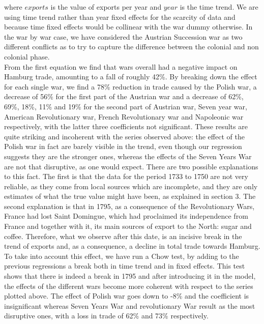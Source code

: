 \documentclass[12pt,a4paper,titlepage,english]{article}
\begin{document}
where $exports$  is the value of exports per year and  $year$ is the time trend. We are using time trend rather than year fixed effects for the scarcity of data and because time fixed effects would be collinear with the war dummy otherwise.
In the war by war case, we have considered the Austrian Succession war as two different conflicts as to try to capture the difference between the colonial and non colonial phase.\\
From the first equation we find that wars overall had a negative impact on Hamburg trade, amounting to a fall of roughly 42\%. By breaking down the effect for each single war, we find a 78\% reduction in trade caused by the Polish war, a decrease of 56\% for the first part of the Austrian war and a decrease of 62\%, 69\%, 18\%, 11\% and 19\% for the second part of Austrian war, Seven year war, American Revolutionary war, French Revolutionary war and Napoleonic war respectively, with the latter three coefficients not significant. These results are quite striking and incoherent with the series observed above: the effect of the Polish war in fact are barely visible in the trend, even though our regression suggests they are the stronger ones, whereas the effects of the Seven Years War are not that disruptive, as one would expect. There are two possible explanations to this fact. The first is that the data for the period 1733 to 1750 are not very reliable, as they come from local sources which are incomplete, and they are only estimates of what the true value might have been, as explained in section 3. The second explanation is that in 1795, as a consequence of the Revolutionary Wars, France had lost Saint Domingue, which had proclaimed its independence from France and together with it, its main sources of export to the North: sugar and coffee. Therefore, what we observe after this date, is an incisive break in the trend of exports and, as a consequence, a decline in total trade towards Hamburg. To take into account this effect, we have run a Chow test, by adding to the previous regressions a break both in time trend and in fixed effects. This test shows that there is indeed a break in 1795 and after introducing it in the model, the effects of the different wars become more coherent with respect to the series plotted above. The effect of Polish war goes down to -8\% and the coefficient is insignificant whereas Seven Years War and revolutionary War result as the most disruptive ones, with a loss in trade of 62\% and 73\% respectively. 


\end{document}
